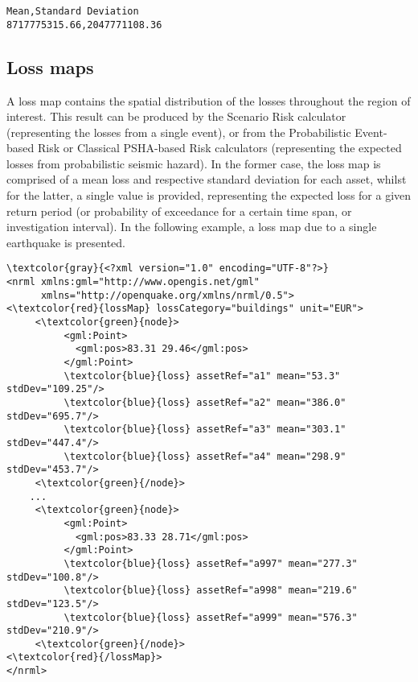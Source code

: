\begin{Verbatim}[frame=single, commandchars=\\\{\}, samepage=true]
Mean,Standard Deviation
8717775315.66,2047771108.36
\end{Verbatim}

\subsection{Loss maps}

A loss map contains the spatial distribution of the losses throughout the
region of interest. This result can be produced by the Scenario Risk
calculator (representing the losses from a single event), or from the
Probabilistic Event-based Risk or Classical PSHA-based Risk calculators
(representing the expected losses from probabilistic seismic hazard). In the
former case, the loss map is comprised of a mean loss and respective standard
deviation for each \gls{asset}, whilst for the latter, a single value is
provided, representing the expected loss for a given return period (or
probability of exceedance for a certain time span, or investigation interval).
In the following example, a loss map due to a single earthquake is presented.

\begin{Verbatim}[frame=single, commandchars=\\\{\}, samepage=false]
\textcolor{gray}{<?xml version="1.0" encoding="UTF-8"?>}
<nrml xmlns:gml="http://www.opengis.net/gml"
      xmlns="http://openquake.org/xmlns/nrml/0.5">
<\textcolor{red}{lossMap} lossCategory="buildings" unit="EUR">
     <\textcolor{green}{node}>
          <gml:Point>
            <gml:pos>83.31 29.46</gml:pos>
          </gml:Point>
          \textcolor{blue}{loss} assetRef="a1" mean="53.3" stdDev="109.25"/>
          \textcolor{blue}{loss} assetRef="a2" mean="386.0" stdDev="695.7"/>
          \textcolor{blue}{loss} assetRef="a3" mean="303.1" stdDev="447.4"/>
          \textcolor{blue}{loss} assetRef="a4" mean="298.9" stdDev="453.7"/>
     <\textcolor{green}{/node}>
    ...
     <\textcolor{green}{node}>
          <gml:Point>
            <gml:pos>83.33 28.71</gml:pos>
          </gml:Point>
          \textcolor{blue}{loss} assetRef="a997" mean="277.3" stdDev="100.8"/>
          \textcolor{blue}{loss} assetRef="a998" mean="219.6" stdDev="123.5"/>
          \textcolor{blue}{loss} assetRef="a999" mean="576.3" stdDev="210.9"/>
     <\textcolor{green}{/node}>
<\textcolor{red}{/lossMap}>
</nrml>
\end{Verbatim}


